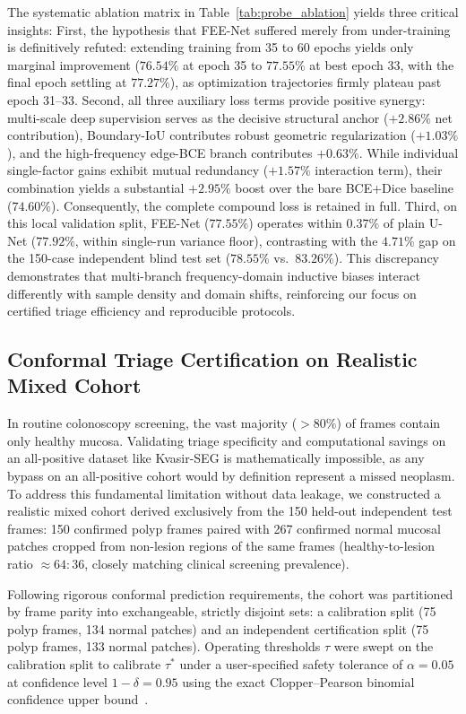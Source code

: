 \documentclass[journal]{IEEEtran}
\begin{document}
The systematic ablation matrix in Table~\ref{tab:probe_ablation} yields three critical insights:
First, the hypothesis that FEE-Net suffered merely from under-training is definitively refuted: extending training from 35 to 60 epochs yields only marginal improvement ($76.54\%$ at epoch 35 to $77.55\%$ at best epoch 33, with the final epoch settling at $77.27\%$), as optimization trajectories firmly plateau past epoch 31--33.
Second, all three auxiliary loss terms provide positive synergy: multi-scale deep supervision serves as the decisive structural anchor ($+2.86\%$ net contribution), Boundary-IoU contributes robust geometric regularization ($+1.03\%$), and the high-frequency edge-BCE branch contributes $+0.63\%$. While individual single-factor gains exhibit mutual redundancy ($+1.57\%$ interaction term), their combination yields a substantial $+2.95\%$ boost over the bare BCE+Dice baseline ($74.60\%$). Consequently, the complete compound loss is retained in full.
Third, on this local validation split, FEE-Net ($77.55\%$) operates within $0.37\%$ of plain U-Net ($77.92\%$, within single-run variance floor), contrasting with the $4.71\%$ gap on the 150-case independent blind test set ($78.55\%$ vs.\ $83.26\%$). This discrepancy demonstrates that multi-branch frequency-domain inductive biases interact differently with sample density and domain shifts, reinforcing our focus on certified triage efficiency and reproducible protocols.

\subsection{Conformal Triage Certification on Realistic Mixed Cohort}
In routine colonoscopy screening, the vast majority ($>80\%$) of frames contain only healthy mucosa. Validating triage specificity and computational savings on an all-positive dataset like Kvasir-SEG is mathematically impossible, as any bypass on an all-positive cohort would by definition represent a missed neoplasm. To address this fundamental limitation without data leakage, we constructed a realistic mixed cohort derived exclusively from the 150 held-out independent test frames: 150 confirmed polyp frames paired with 267 confirmed normal mucosal patches cropped from non-lesion regions of the same frames (healthy-to-lesion ratio $\approx 64:36$, closely matching clinical screening prevalence).

Following rigorous conformal prediction requirements, the cohort was partitioned by frame parity into exchangeable, strictly disjoint sets: a calibration split (75 polyp frames, 134 normal patches) and an independent certification split (75 polyp frames, 133 normal patches). Operating thresholds $\tau$ were swept on the calibration split to calibrate $\tau^*$ under a user-specified safety tolerance of $\alpha = 0.05$ at confidence level $1 - \delta = 0.95$ using the exact Clopper--Pearson binomial confidence upper bound~\cite{clopper1934use}. 
\end{document}
